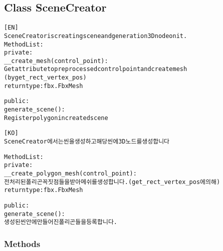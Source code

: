 

\subsection{Class SceneCreator}

    \label{osm2fbx:fbx:module:SceneCreator}
\begin{alltt}

[EN]
SceneCreator is creating scene and generation 3D node on it.
Method List:
    private:
        \_\_create\_mesh(control\_point):
            Get attribute to preprocessed control point and create mesh
            (by get\_rect\_vertex\_pos)
            return type: fbx.FbxMesh

    public:
        generate\_scene():
            Register polygon in created scene

[KO]
SceneCreator 에서는 씬을 생성하고 해당 씬에 3D 노드를 생성합니다

Method List:
    private:
        \_\_create\_polygon\_mesh(control\_point):
            전처리된 폴리곤 꼭짓점들을 받아 메쉬를 생성합니다. (get\_rect\_vertex\_pos에 의해)
            return type: fbx.FbxMesh

    public:
        generate\_scene():
            생성된 씬 안에 만들어진 폴리곤들을 등록합니다.
\end{alltt}



  \subsubsection{Methods}

    \label{osm2fbx:fbx:module:SceneCreator:__init__}

